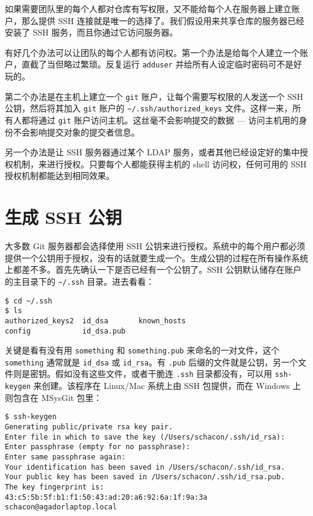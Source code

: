 \documentclass[a4paper]{book}
\begin{document}
如果需要团队里的每个人都对仓库有写权限，又不能给每个人在服务器上建立账户，那么提供 SSH 连接就是唯一的选择了。我们假设用来共享仓库的服务器已经安装了 SSH 服务，而且你通过它访问服务器。

有好几个办法可以让团队的每个人都有访问权。第一个办法是给每个人建立一个账户，直截了当但略过繁琐。反复运行 \texttt{adduser} 并给所有人设定临时密码可不是好玩的。

第二个办法是在主机上建立一个 \texttt{git} 账户，让每个需要写权限的人发送一个 SSH 公钥，然后将其加入 \texttt{git} 账户的 \texttt{\textasciitilde{}/.ssh/authorized\_keys} 文件。这样一来，所有人都将通过 \texttt{git} 账户访问主机。这丝毫不会影响提交的数据 --- 访问主机用的身份不会影响提交对象的提交者信息。

另一个办法是让 SSH 服务器通过某个 LDAP 服务，或者其他已经设定好的集中授权机制，来进行授权。只要每个人都能获得主机的 shell 访问权，任何可用的 SSH 授权机制都能达到相同效果。

\section{生成 SSH 公钥}

大多数 Git 服务器都会选择使用 SSH 公钥来进行授权。系统中的每个用户都必须提供一个公钥用于授权，没有的话就要生成一个。生成公钥的过程在所有操作系统上都差不多。首先先确认一下是否已经有一个公钥了。SSH 公钥默认储存在账户的主目录下的 \texttt{\textasciitilde{}/.ssh} 目录。进去看看：

\begin{shaded}\begin{verbatim}
$ cd ~/.ssh
$ ls
authorized_keys2  id_dsa       known_hosts
config            id_dsa.pub
\end{verbatim}\end{shaded}

关键是看有没有用 \texttt{something} 和 \texttt{something.pub} 来命名的一对文件，这个 \texttt{something} 通常就是 \texttt{id\_dsa} 或 \texttt{id\_rsa}。有 \texttt{.pub} 后缀的文件就是公钥，另一个文件则是密钥。假如没有这些文件，或者干脆连 \texttt{.ssh} 目录都没有，可以用 \texttt{ssh-keygen} 来创建。该程序在 Linux/Mac 系统上由 SSH 包提供，而在 Windows 上则包含在 MSysGit 包里：

\begin{shaded}\begin{verbatim}
$ ssh-keygen 
Generating public/private rsa key pair.
Enter file in which to save the key (/Users/schacon/.ssh/id_rsa): 
Enter passphrase (empty for no passphrase): 
Enter same passphrase again: 
Your identification has been saved in /Users/schacon/.ssh/id_rsa.
Your public key has been saved in /Users/schacon/.ssh/id_rsa.pub.
The key fingerprint is:
43:c5:5b:5f:b1:f1:50:43:ad:20:a6:92:6a:1f:9a:3a schacon@agadorlaptop.local
\end{verbatim}\end{shaded}
\end{document}
